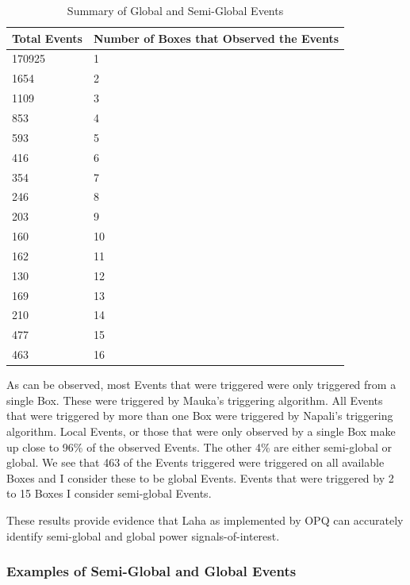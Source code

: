 \begin{table}[H]
    \centering
    \caption{Summary of Global and Semi-Global Events}
    \begin{tabularx}{\textwidth}{ll}
        \toprule
        \textbf{Total Events} & \textbf{Number of Boxes that Observed the Events} \\
        \midrule
        170925 & 1 \\
        1654 & 2 \\
        1109 & 3 \\
        853 & 4 \\
        593 & 5 \\
        416 & 6 \\
        354 & 7 \\
        246 & 8 \\
        203 & 9 \\
        160 & 10 \\
        162 & 11 \\
        130 & 12 \\
        169 & 13 \\
        210 & 14 \\
        477 & 15 \\
        463 & 16 \\
        \bottomrule
    \end{tabularx}
    \label{table:global_summary}
\end{table}

As can be observed, most Events that were triggered were only triggered from a single Box. These were triggered by Mauka's triggering algorithm. All Events that were triggered by more than one Box were triggered by Napali's triggering algorithm. Local Events, or those that were only observed by a single Box make up close to 96\% of the observed Events. The other 4\% are either semi-global or global. We see that 463 of the Events triggered were triggered on all available Boxes and I consider these to be global Events. Events that were triggered by 2 to 15 Boxes I consider semi-global Events.

These results provide evidence that Laha as implemented by OPQ can accurately identify semi-global and global power signals-of-interest.

\subsubsection{Examples of Semi-Global and Global Events}


